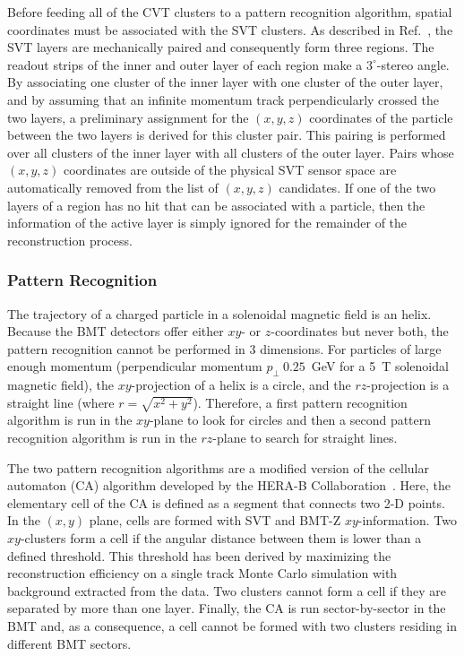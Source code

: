 Before feeding all of the CVT clusters to a pattern recognition algorithm, spatial coordinates must be associated with
the SVT clusters. As described in Ref.~\cite{svt-nim}, the SVT layers are mechanically paired and consequently form
three regions. The readout strips of the inner and outer layer of each region make a $3^\circ$-stereo angle. By
associating one cluster of the inner layer with one cluster of the outer layer, and by assuming that an infinite
momentum track perpendicularly crossed the two layers, a preliminary assignment for the $(x,y,z)$ coordinates of
the particle between the two layers is derived for this cluster pair. This pairing is performed over all clusters of the
inner layer with all clusters of the outer layer. Pairs whose $(x,y,z)$ coordinates are outside of the physical SVT
sensor space are automatically removed from the list of $(x,y,z)$ candidates. If one of the two layers of a region has
no hit that can be associated with a particle, then the information of the active layer is simply ignored for the
remainder of the reconstruction process.

\subsubsection{Pattern Recognition}

The trajectory of a charged particle in a solenoidal magnetic field is an helix. Because the BMT detectors offer
either $xy$- or $z$-coordinates but never both, the pattern recognition cannot be performed in 3 dimensions. For
particles of large enough momentum (perpendicular momentum $p_\perp \> 0.25$~GeV for a 5~T solenoidal magnetic
field), the $xy$-projection of a helix is a circle, and the $rz$-projection is a straight line (where
$r = \sqrt{x^2 + y^2}$). Therefore, a first pattern recognition algorithm is run in the $xy$-plane to look for circles
and then a second pattern recognition algorithm is run in the $rz$-plane to search for straight lines.

The two pattern recognition algorithms are a modified version of the cellular automaton (CA) algorithm developed
by the HERA-B Collaboration~\cite{CA-HeraB}. Here, the elementary cell of the CA is defined as a segment that
connects two 2-D points. In the $(x,y)$ plane, cells are formed with SVT and BMT-Z $xy$-information. Two
$xy$-clusters form a cell if the angular distance between them is lower than a defined threshold. This threshold
has been derived by maximizing the reconstruction efficiency on a single track Monte Carlo simulation with
background extracted from the data. Two clusters cannot form a cell if they are separated by more than one layer.
Finally, the CA is run sector-by-sector in the BMT and, as a consequence, a cell cannot be formed with two clusters
residing in different BMT sectors.

